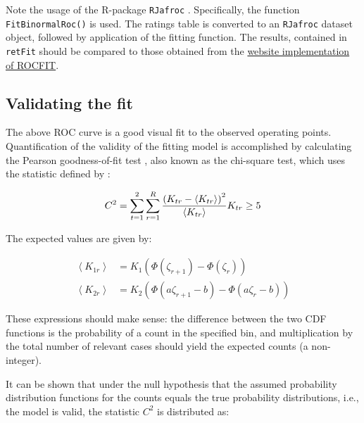 \documentclass[
]{book}
\begin{document}
Note the usage of the R-package \texttt{RJafroc} \citep{R-RJafroc}. Specifically, the function \texttt{FitBinormalRoc()} is used. The ratings table is converted to an \texttt{RJafroc} dataset object, followed by application of the fitting function. The results, contained in \texttt{retFit} should be compared to those obtained from the \href{http://www.rad.jhmi.edu/jeng/javarad/roc/JROCFITi.html}{website implementation of ROCFIT}.

\hypertarget{binormal-model-curve-fitting-validation}{%
\subsection{Validating the fit}\label{binormal-model-curve-fitting-validation}}

The above ROC curve is a good visual fit to the observed operating points. Quantification of the validity of the fitting model is accomplished by calculating the Pearson goodness-of-fit test \citep{RN2656}, also known as the chi-square test, which uses the statistic defined by \citep{larsen2005introduction}:

\begin{equation} 
C^2=\sum_{t=1}^{2}\sum_{r=1}^{R}\frac{\left (K_{tr}-\left \langle K_{tr} \right \rangle  \right )^2}{\left \langle K_{tr} \right \rangle}\\
K_{tr} \geq 5
\label{eq:binormal-modelGoodnessFit}
\end{equation}

The expected values are given by:

\begin{equation}
\begin{split}
\left \langle K_{1r} \right \rangle &=K_1\left ( \Phi\left ( \zeta_{r+1} \right ) - \Phi\left ( \zeta_r \right )  \right ) \\
\left \langle K_{2r} \right \rangle &=K_2\left ( \Phi\left ( a\zeta_{r+1}-b \right ) - \Phi\left ( a\zeta_r - b\right )  \right )
\end{split}
\label{eq:binormal-modelGoodnessFitExpVals}
\end{equation}

These expressions should make sense: the difference between the two CDF functions is the probability of a count in the specified bin, and multiplication by the total number of relevant cases should yield the expected counts (a non-integer).

It can be shown that under the null hypothesis that the assumed probability distribution functions for the counts equals the true probability distributions, i.e., the model is valid, the statistic \(C^2\) is distributed as:
\end{document}
